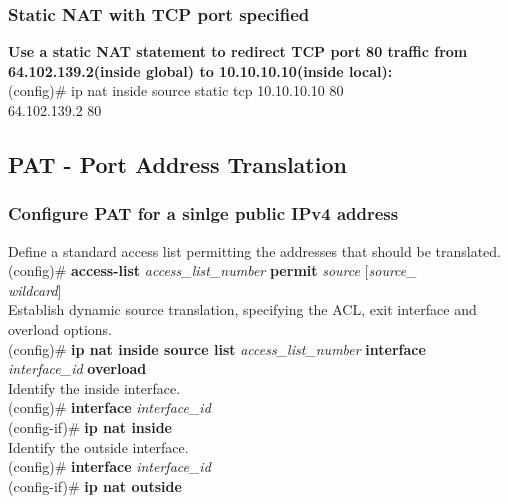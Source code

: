 \subsubsection*{Static NAT with TCP port specified}
\textrm{\textbf{Use a static NAT statement to redirect TCP port 80 traffic from 64.102.139.2(inside global) to 10.10.10.10(inside local):}}\\
(config)\# ip nat inside source static tcp 10.10.10.10 80 \\64.102.139.2 80
\subsection{PAT - Port Address Translation}
\subsubsection*{Configure PAT for a sinlge public IPv4 address}
\textrm{Define a standard access list permitting the addresses that should be translated.}\\
(config)\# \textbf{access-list} \textit{access\_list\_number} \textbf{permit} \textit{source} [\textit{source\_\\wildcard}]\vspace{11pt}\\
\textrm{Establish dynamic source translation, specifying the ACL, exit interface and overload options.}\\
(config)\# \textbf{ip nat inside source list} \textit{access\_list\_number} \textbf{interface} \\\textit{interface\_id} \textbf{overload}\vspace{11pt}\\
\textrm{Identify the inside interface.}\\
(config)\# \textbf{interface} \textit{interface\_id}\\
(config-if)\# \textbf{ip nat inside}\vspace{11pt}\\
\textrm{Identify the outside interface.}\\
(config)\# \textbf{interface} \textit{interface\_id}\\
(config-if)\# \textbf{ip nat outside}
